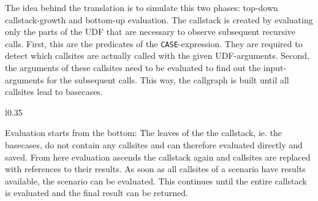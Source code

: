 The idea behind the translation is to simulate this two phases: top-down callstack-growth and bottom-up evaluation. The callstack is created by evaluating only the parts of the UDF that are necessary to observe subsequent recursive calls. First, this are the predicates of the \texttt{CASE}-expression. They are required to detect which callsites are actually called with the given UDF-arguments. Second, the arguments of these callsites need to be evaluated to find out the input-arguments for the subsequent calls. This way, the callgraph is built until all callsites lead to basecases.




\begin{wrapfigure}{l}{0.35\linewidth}
\centering

\caption{}\label{tbl:evaluation}
\end{wrapfigure}

Evaluation starts from the bottom: The leaves of the the callstack, ie. the basecases, do not contain any callsites and can therefore evaluated directly and saved. From here evaluation ascends the callstack again and callsites are replaced with references to their results. As soon as all callsites of a scenario have results available, the scenario can be evaluated. This continues until the entire callstack is evaluated and the final result can be returned.



